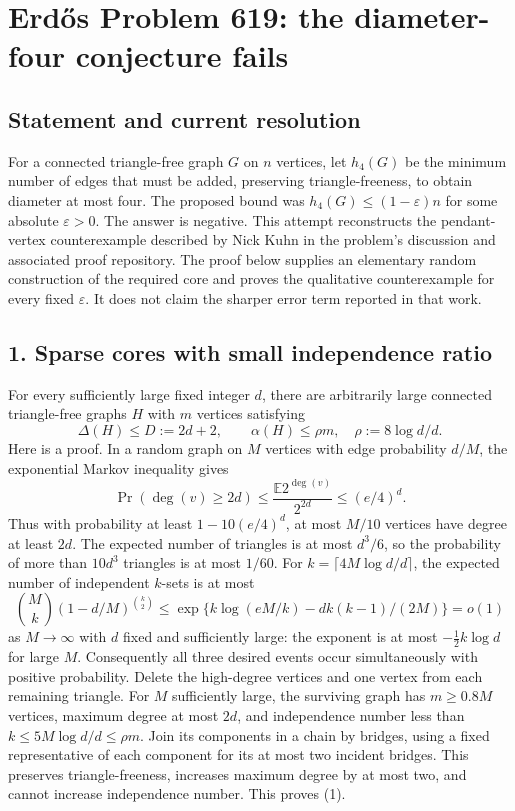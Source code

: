 \section{Erd\H{o}s Problem 619: the diameter-four conjecture fails}
\subsection*{Statement and current resolution}
For a connected triangle-free graph $G$ on $n$ vertices, let $h_4(G)$ be the minimum number of edges that must be added, preserving triangle-freeness, to obtain diameter at most four. The proposed bound was $h_4(G)\le(1-\varepsilon)n$ for some absolute $\varepsilon>0$.
The answer is negative. This attempt reconstructs the pendant-vertex counterexample described by Nick Kuhn in the problem's discussion and associated proof repository. The proof below supplies an elementary random construction of the required core and proves the qualitative counterexample for every fixed $\varepsilon$. It does not claim the sharper error term reported in that work.

\subsection*{1. Sparse cores with small independence ratio}
For every sufficiently large fixed integer $d$, there are arbitrarily large connected triangle-free graphs $H$ with $m$ vertices satisfying
\[
 \Delta(H)\le D:=2d+2,\qquad
 \alpha(H)\le\rho m,\quad \rho:=8\log d/d.
 \tag{1}
\]
Here is a proof. In a random graph on $M$ vertices with edge probability $d/M$, the exponential Markov inequality gives
\[
 \Pr(\deg(v)\ge2d)\le\frac{\mathbb E2^{\deg(v)}}{2^{2d}}
 \le(e/4)^d.
\]
Thus with probability at least $1-10(e/4)^d$, at most $M/10$ vertices have degree at least $2d$. The expected number of triangles is at most $d^3/6$, so the probability of more than $10d^3$ triangles is at most $1/60$.
For $k=\lceil4M\log d/d\rceil$, the expected number of independent $k$-sets is at most
\[
 \binom Mk(1-d/M)^{\binom k2}
 \le\exp\{k\log(eM/k)-dk(k-1)/(2M)\}=o(1)
\]
as $M\to\infty$ with $d$ fixed and sufficiently large: the exponent is at most $-\tfrac12k\log d$ for large $M$.
Consequently all three desired events occur simultaneously with positive probability.
Delete the high-degree vertices and one vertex from each remaining triangle. For $M$ sufficiently large, the surviving graph has $m\ge0.8M$ vertices, maximum degree at most $2d$, and independence number less than $k\le5M\log d/d\le\rho m$. Join its components in a chain by bridges, using a fixed representative of each component for its at most two incident bridges. This preserves triangle-freeness, increases maximum degree by at most two, and cannot increase independence number. This proves (1).

